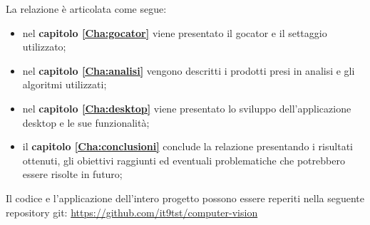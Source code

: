 \noindent La relazione è articolata come segue:
\begin{itemize}
	\item nel \textbf{capitolo \ref{Cha:gocator}} viene presentato il gocator e il settaggio utilizzato;
	\item nel \textbf{capitolo \ref{Cha:analisi}} vengono descritti i prodotti presi in analisi e gli algoritmi utilizzati;
	\item nel \textbf{capitolo \ref{Cha:desktop}} viene presentato lo sviluppo dell'applicazione desktop e le sue funzionalità;
	\item il \textbf{capitolo \ref{Cha:conclusioni}} conclude la relazione presentando i risultati ottenuti, gli obiettivi raggiunti ed eventuali problematiche che potrebbero essere risolte in futuro;
\end{itemize}
Il codice e l'applicazione dell'intero progetto possono essere reperiti nella seguente repository git: \href{https://github.com/it9tst/computer-vision}{https://github.com/it9tst/computer-vision}